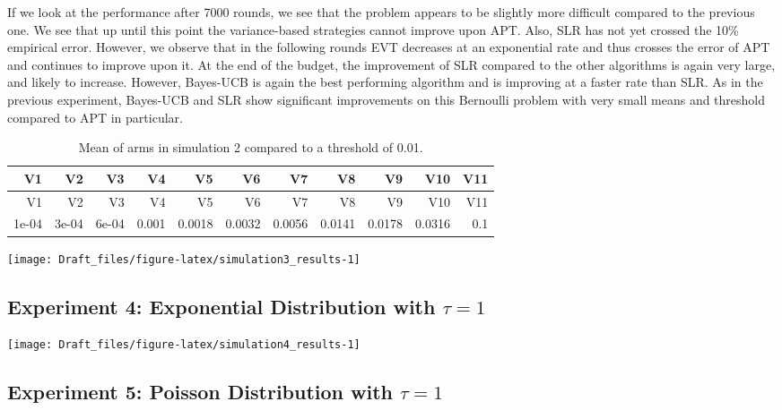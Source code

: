 \documentclass[12pt,]{article}
\begin{document}
If we look at the performance after 7000 rounds, we see that the problem
appears to be slightly more difficult compared to the previous one. We
see that up until this point the variance-based strategies cannot
improve upon APT. Also, SLR has not yet crossed the 10\% empirical
error. However, we observe that in the following rounds EVT decreases at
an exponential rate and thus crosses the error of APT and continues to
improve upon it. At the end of the budget, the improvement of SLR
compared to the other algorithms is again very large, and likely to
increase. However, Bayes-UCB is again the best performing algorithm and
is improving at a faster rate than SLR. As in the previous experiment,
Bayes-UCB and SLR show significant improvements on this Bernoulli
problem with very small means and threshold compared to APT in
particular.

\begin{longtable}[]{@{}rrrrrrrrrrr@{}}
\caption{Mean of arms in simulation 2 compared to a threshold of
0.01.}\tabularnewline
\toprule
V1 & V2 & V3 & V4 & V5 & V6 & V7 & V8 & V9 & V10 & V11\tabularnewline
\midrule
\endfirsthead
\toprule
V1 & V2 & V3 & V4 & V5 & V6 & V7 & V8 & V9 & V10 & V11\tabularnewline
\midrule
\endhead
1e-04 & 3e-04 & 6e-04 & 0.001 & 0.0018 & 0.0032 & 0.0056 & 0.0141 &
0.0178 & 0.0316 & 0.1\tabularnewline
\bottomrule
\end{longtable}

\begin{center}\texttt{[image: Draft\_files/figure-latex/simulation3\_results-1]} \end{center}

\subsection{\texorpdfstring{Experiment 4: Exponential Distribution with
\(\tau = 1\)}{Experiment 4: Exponential Distribution with \textbackslash{}tau = 1}}\label{experiment-4-exponential-distribution-with-tau-1}

\begin{center}\texttt{[image: Draft\_files/figure-latex/simulation4\_results-1]} \end{center}

\subsection{\texorpdfstring{Experiment 5: Poisson Distribution with
\(\tau = 1\)}{Experiment 5: Poisson Distribution with \textbackslash{}tau = 1}}\label{experiment-5-poisson-distribution-with-tau-1}
\end{document}
